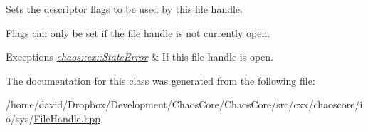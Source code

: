 Sets the descriptor flags to be used by this file handle. 

Flags can only be set if the file handle is not currently open.


\begin{DoxyExceptions}{Exceptions}
{\em \hyperlink{classchaos_1_1ex_1_1_state_error}{chaos\-::ex\-::\-State\-Error}} & If this file handle is open. \\
\hline
\end{DoxyExceptions}


The documentation for this class was generated from the following file\-:\begin{DoxyCompactItemize}
\item 
/home/david/\-Dropbox/\-Development/\-Chaos\-Core/\-Chaos\-Core/src/cxx/chaoscore/io/sys/\hyperlink{_file_handle_8hpp}{File\-Handle.\-hpp}\end{DoxyCompactItemize}
